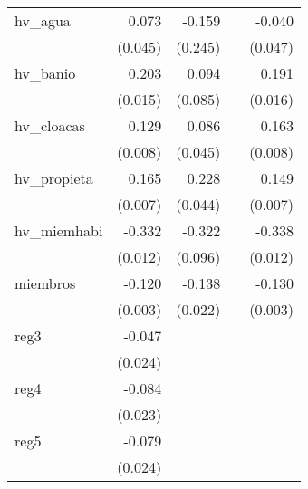 {\begin{longtable}{l*{4}{D{.}{.}{-1}}}
\addlinespace
hv\_agua     &       0.073         &      -0.159         &                     &      -0.040         \\
            &     (0.045)         &     (0.245)         &                     &     (0.047)         \\
\addlinespace
hv\_banio    &       0.203\sym{***}&       0.094         &                     &       0.191\sym{***}\\
            &     (0.015)         &     (0.085)         &                     &     (0.016)         \\
\addlinespace
hv\_cloacas  &       0.129\sym{***}&       0.086         &                     &       0.163\sym{***}\\
            &     (0.008)         &     (0.045)         &                     &     (0.008)         \\
\addlinespace
hv\_propieta &       0.165\sym{***}&       0.228\sym{***}&                     &       0.149\sym{***}\\
            &     (0.007)         &     (0.044)         &                     &     (0.007)         \\
\addlinespace
hv\_miemhabi &      -0.332\sym{***}&      -0.322\sym{***}&                     &      -0.338\sym{***}\\
            &     (0.012)         &     (0.096)         &                     &     (0.012)         \\
\addlinespace
miembros    &      -0.120\sym{***}&      -0.138\sym{***}&                     &      -0.130\sym{***}\\
            &     (0.003)         &     (0.022)         &                     &     (0.003)         \\
\addlinespace
reg3        &      -0.047\sym{*}  &                     &                     &                     \\
            &     (0.024)         &                     &                     &                     \\
\addlinespace
reg4        &      -0.084\sym{***}&                     &                     &                     \\
            &     (0.023)         &                     &                     &                     \\
\addlinespace
reg5        &      -0.079\sym{***}&                     &                     &                     \\
            &     (0.024)         &                     &                     &                     \\

\end{longtable}}
